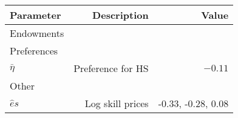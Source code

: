 \begin{tabular}{lrr}
\hline
Parameter & Description  & Value  \\
\hline
Endowments &   &   \\
Preferences &   &   \\
$\bar{\eta}$ & Preference for HS  & $-0.11$  \\
Other &   &   \\
$\hat{e}{s}$ & Log skill prices  & -0.33, -0.28, 0.08  \\
\hline
\end{tabular}%
